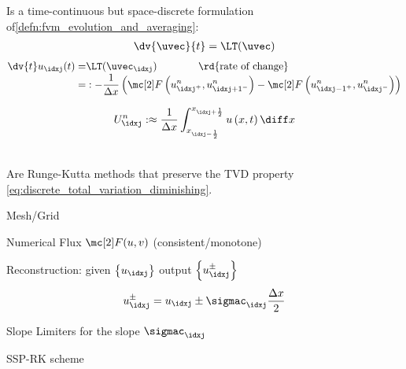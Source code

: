 \begin{defnbox}\nospacing
    \begin{defn}\label{defn:semi_discrete_fvm}
        Is a time-continuous but space-discrete formulation of\cref{defn:fvm_evolution_and_averaging}:
        \begin{align}
          \dv{\uvec}{t}=\LT(\uvec)
        \end{align}
        \begin{align}
          \dv{t}u_{\idxj}(t)=&\LT(\uvec_{\idxj})\qquad\qquad\text{\rd{rate of change}}\label{eq:evolution_and_averaging}\\[-1\jot]
          =&:-\frac{1}{\Delta x} \left(\Flux \left(u_{\idxj^{+}}^{n},u_{{\idxj+1}^{-}}^{n}\right)- \Flux \left(u_{{\idxj-1}^{+}}^{n},u_{{\idxj}^{-}}^{n}\right) \right)\nonumber
        \end{align}
    \end{defn}
\end{defnbox}
\begin{defnbox}\nospacing
    \begin{defn}\label{defn:cell_averages_semi_discrete}\leavevmode
      \begin{align}
        U_{\idxj}^{n}:\approx\frac{1}{\Delta x}\int_{x_{\idxj-\frac{1}{2}}}^{x_{\idxj+\frac{1}{2}}}u\left(x,t\right)\diff x
      \end{align}
    \end{defn}
\end{defnbox}
\begin{defnbox}\nospacing
    \begin{defn}\label{defn:s_runge-kutta_methods}\leavevmode\\
        Are Runge-Kutta methods that preserve the TVD property \cref{eq:discrete_total_variation_diminishing}.
    \end{defn}
\end{defnbox}
\begin{sectionbox}\nospacing
    \begin{circlelistnosep}
        \item Mesh/Grid
        \item Numerical Flux $\Flux(u,v)$ (consistent/monotone)
        \item Reconstruction: given $\left\{u_{\idxj}\right\}$ output $\left\{u_{\idxj}^{\pm}\right\}$
        \begin{align*}
          u_{\idxj}^{\pm}=u_{\idxj}\pm\sigmac_{\idxj}\frac{\Delta x}{2}
        \end{align*}
        \item Slope Limiters for the slope $\sigmac_{\idxj}$
        \item SSP-RK scheme
    \end{circlelistnosep}
\end{sectionbox}

